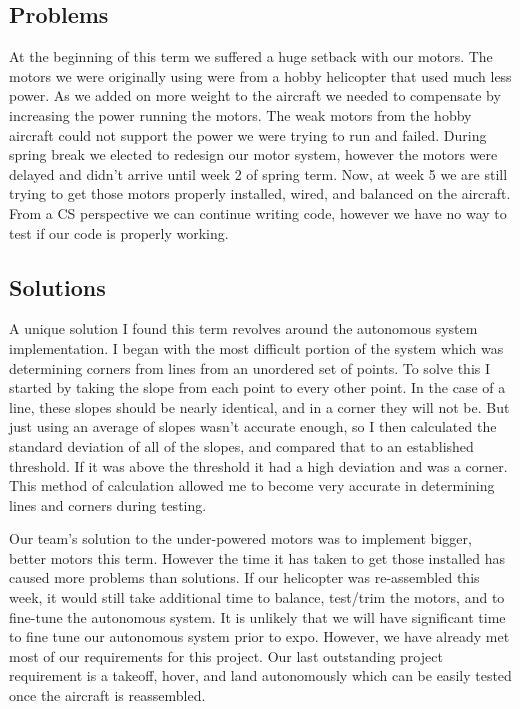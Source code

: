 \documentclass[onecolumn, draftclsnofoot,10pt, compsoc]{IEEEtran}
\begin{document}
\subsection{Problems}

At the beginning of this term we suffered a huge setback with our motors. The motors we were originally using were from a hobby helicopter that used much less power. As we added on more weight to the aircraft we needed to compensate by increasing the power running the motors. The weak motors from the hobby aircraft could not support the power we were trying to run and failed. During spring break we elected to redesign our motor system, however the motors were delayed and didn’t arrive until week 2 of spring term. Now, at week 5 we are still trying to get those motors properly installed, wired, and balanced on the aircraft. From a CS perspective we can continue writing code, however we have no way to test if our code is properly working. 

\subsection{Solutions}

A unique solution I found this term revolves around the autonomous system implementation. I began with the most difficult portion of the system which was determining corners from lines from an unordered set of points. To solve this I started by taking the slope from each point to every other point. In the case of a line, these slopes should be nearly identical, and in a corner they will not be. But just using an average of slopes wasn’t accurate enough, so I then calculated the standard deviation of all of the slopes, and compared that to an established threshold. If it was above the threshold it had a high deviation and was a corner. This method of calculation allowed me to become very accurate in determining lines and corners during testing. 

Our team’s solution to the under-powered motors was to implement bigger, better motors this term. However the time it has taken to get those installed has caused more problems than solutions. If our helicopter was re-assembled this week, it would still take additional time to balance, test/trim the motors, and to fine-tune the autonomous system. It is unlikely that we will have significant time to fine tune our autonomous system prior to expo. However, we have already met most of our requirements for this project. Our last outstanding project requirement is a takeoff, hover, and land autonomously which can be easily tested once the aircraft is reassembled. 
\end{document}
